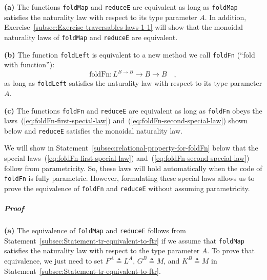 \textbf{(a)} The functions \lstinline!foldMap! and \lstinline!reduceE!
are equivalent as long as \lstinline!foldMap! satisfies the naturality
law with respect to its type parameter $A$. In addition, Exercise~\ref{subsec:Exercise-traversables-laws-1-1}
will show that the monoidal naturality laws of \lstinline!foldMap!
and \lstinline!reduceE! are equivalent.

\textbf{(b)} The function \lstinline!foldLeft! is equivalent to a
new method we call \lstinline!foldFn! (\textsf{``}fold with function\textsf{''}):
\[
\text{foldFn}:L^{B\rightarrow B}\rightarrow B\rightarrow B\quad,
\]
as long as \lstinline!foldLeft! satisfies the naturality law with
respect to its type parameter $A$.

\textbf{(c)} The functions \lstinline!foldFn! and \lstinline!reduceE!
are equivalent as long as \lstinline!foldFn! obeys the laws~(\ref{eq:foldFn-first-special-law})
and~(\ref{eq:foldFn-second-special-law}) shown below and \lstinline!reduceE!
satisfies the monoidal naturality law. 

We will show in Statement~\ref{subsec:relational-property-for-foldFn}
below that the special laws~(\ref{eq:foldFn-first-special-law})
and~(\ref{eq:foldFn-second-special-law}) follow from parametricity.
So, these laws will hold automatically when the code of \lstinline!foldFn!
is fully parametric. However, formulating these special laws allows
us to prove the equivalence of \lstinline!foldFn! and \lstinline!reduceE!
without assuming parametricity.

\subparagraph{Proof}

\textbf{(a)} The equivalence of \lstinline!foldMap! and \lstinline!reduceE!
follows from Statement~\ref{subsec:Statement-tr-equivalent-to-ftr}
if we assume that \lstinline!foldMap! satisfies the naturality law
with respect to the type parameter $A$. To prove that equivalence,
we just need to set $F^{A}\triangleq L^{A}$, $G^{B}\triangleq M$,
and $K^{B}\triangleq M$ in Statement~\ref{subsec:Statement-tr-equivalent-to-ftr}.

